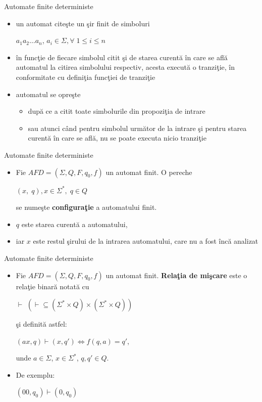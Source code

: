 \documentclass[pdf]{beamer}
\begin{document}
\begin{frame}{Automate finite deterministe}
\begin{itemize}
\item
un automat citeşte un şir finit de simboluri 

$a_{1} a_{2} \dots a_{n}$, $a_{i} \in \Sigma, \forall \; 1 \leq i \leq n$

\item
în funcţie de fiecare simbolul citit şi de starea curentă în care se află automatul la citirea simbolului respectiv, acesta execută o tranziţie, în conformitate cu definiţia funcţiei de tranziţie
\item
automatul se opreşte 
\begin{itemize}
\item
după ce a citit toate simbolurile din propoziţia de intrare
\item
sau atunci când pentru simbolul următor de la intrare şi pentru starea curentă în care se află, nu se poate executa nicio tranziţie
\end{itemize}
\end{itemize}
\end{frame}



\begin{frame}{Automate finite deterministe}
\begin{itemize}
\item
Fie $AFD=(\Sigma, Q, F, q_{0}, f)$ un automat finit. O pereche 

$(x, \; q), x \in \Sigma^{*}, \; q \in Q$ 

se numeşte \textbf{configuraţie} a automatului finit. 
\item
$q$ este starea curentă a automatului, 
\item
iar $x$ este restul şirului de la intrarea automatului, care nu a fost încă analizat
\end{itemize}
\end{frame}



\begin{frame}{Automate finite deterministe}
\begin{itemize}
\item
Fie $AFD=(\Sigma, Q, F, q_{0}, f)$ un automat finit. \textbf{Relaţia de mişcare} este o relaţie binară notată cu 

$\vdash$ $(\vdash \subseteq (\Sigma^{*} \times Q) \times (\Sigma^{*} \times Q))$ 

şi definită astfel:

$(ax, q) \vdash (x, q') \Leftrightarrow f(q, a) = q'$, 

unde $a \in \Sigma$, $x \in \Sigma^{*}$, $q, q' \in Q$.

\item
De exemplu:

$(00, q_0) \vdash (0, q_0)$
\end{itemize}
\end{frame}
\end{document}
